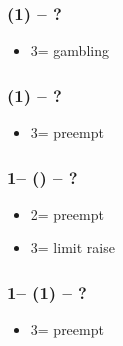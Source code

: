 \documentclass[12pt, a4paper]{article}
\begin{document}


\subsubsection*{(1\diams) -- ?}
\begin{itemize}
    \item 3\diams = gambling \clubs
\end{itemize}

\subsubsection*{(1\clubs) -- ?}
\begin{itemize}
    \item 3\clubs = \clubs preempt
\end{itemize}

\subsubsection*{1\clubs -- (\dbl) -- ?}
\begin{itemize}
    \item 2\nt = preempt \clubs
    \item 3\clubs = limit raise
\end{itemize}

\subsubsection*{1\clubs -- (1) -- ?}
\begin{itemize}
    \item 3\clubs = preempt
\end{itemize}
\end{document}
